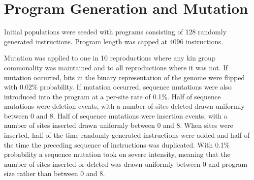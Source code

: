 \section{Program Generation and Mutation}
\label{sec:generation_mutation}

Initial populations were seeded with programs consisting of 128 randomly generated instructions.
Program length was capped at 4096 instructions.

Mutation was applied to one in 10 reproductions where any kin group commonality was maintained and to all reproductions where it was not.
If mutation occurred, bits in the binary representation of the genome were flipped with 0.02\% probability.
If mutation occurred, sequence mutations were also introduced into the program at a per-site rate of 0.1\%.
Half of sequence mutations were deletion events, with a number of sites deleted drawn uniformly between 0 and 8.
Half of sequence mutations were insertion events, with a number of sites inserted drawn uniformly between 0 and 8.
When sites were inserted, half of the time randomly-generated instructions were added and half of the time the preceding sequence of instructions was duplicated.
With 0.1\% probability a sequence mutation took on severe intensity, meaning that the number of sites inserted or deleted was drawn uniformly between 0 and program size rather than between 0 and 8.
